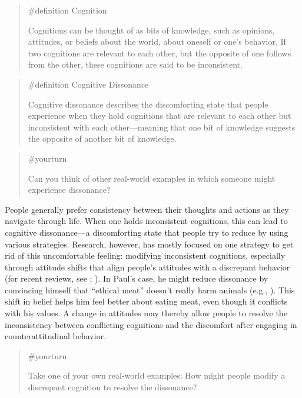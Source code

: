 \documentclass[
  letterpaper,
]{book}
\begin{document}
\begin{quote}
\label{def-cognition}{\#definition} Cognition

Cognitions can be thought of as bits of knowledge, such as opinions,
attitudes, or beliefs about the world, about oneself or one's behavior.
If two cognitions are relevant to each other, but the opposite of one
follows from the other, these cognitions are said to be inconsistent.
\end{quote}

\begin{quote}
\label{def-cognitivedissonance}{\#definition} Cognitive
Dissonance

Cognitive dissonance describes the discomforting state that people
experience when they hold cognitions that are relevant to each other but
inconsistent with each other---meaning that one bit of knowledge
suggests the opposite of another bit of knowledge.
\end{quote}

\begin{quote}
{\#yourturn}

Can you think of other real-world examples in which someone might
experience dissonance?
\end{quote}

People generally prefer consistency between their thoughts and actions
as they navigate through life. When one holds inconsistent cognitions,
this can lead to cognitive dissonance---a discomforting state that
people try to reduce by using various strategies. Research, however, has
mostly focused on one strategy to get rid of this uncomfortable feeling:
modifying inconsistent cognitions, especially through attitude shifts
that align people's attitudes with a discrepant behavior (for recent
reviews, see ;
). In Paul's case,
he might reduce dissonance by convincing himself that ``ethical meat''
doesn't really harm animals (e.g.,
). This shift in
belief helps him feel better about eating meat, even though it conflicts
with his values. A change in attitudes may thereby allow people to
resolve the inconsistency between conflicting cognitions and the
discomfort after engaging in counterattitudinal behavior.

\begin{quote}
{\#yourturn}

Take one of your own real-world examples: How might people modify a
discrepant cognition to resolve the dissonance?
\end{quote}
\end{document}
